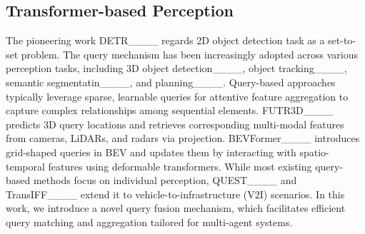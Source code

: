 \subsection{Transformer-based Perception}
The pioneering work DETR____ regards 2D object detection task as a set-to-set problem. The query mechanism has been increasingly adopted across various perception tasks, including 3D object detection____, object tracking____, semantic segmentatin____, and planning____. Query-based approaches typically leverage sparse, learnable queries for attentive feature aggregation to capture complex relationships among sequential elements. FUTR3D____ predicts 3D query locations and retrieves corresponding multi-modal features from cameras, LiDARs, and radars via projection. BEVFormer____ introduces grid-shaped queries in BEV and updates them by interacting with spatio-temporal features using deformable transformers. While most existing query-based methods focus on individual perception, QUEST____ and TransIFF____ extend it to vehicle-to-infrastructure (V2I) scenarios. In this work, we introduce a novel query fusion mechanism, which facilitates efficient query matching and aggregation tailored for multi-agent systems.